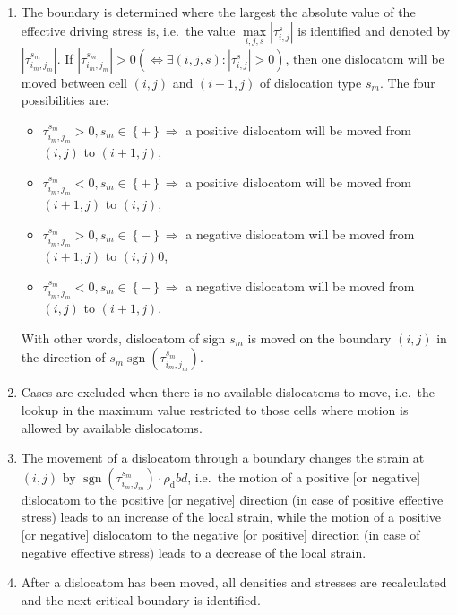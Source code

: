 \begin{enumerate}
\item The boundary is determined where the largest the absolute value of the effective driving stress is, i.e.\ the value $\mathop {\max }\limits_{i,j,s} \left| {\tau _{i,j}^s} \right|$ is identified and denoted by $\left| {\tau _{{i_m},{j_m}}^{{s_m}}} \right|$. If $\left| {\tau _{{i_m},{j_m}}^{{s_m}}} \right| > 0\left( { \Leftrightarrow \exists \left( {i,j,s} \right):\left| {\tau _{i,j}^s} \right| > 0} \right)$, then one dislocatom will be moved between cell $\left( {i,j} \right)$ and $\left( {i+1,j} \right)$ of dislocation type $s_m$. The four possibilities are:
\begin{itemize}
\item $\tau _{{i_m},{j_m}}^{{s_m}} > 0,{s_m} \in \left\{  +  \right\} \Rightarrow $ a positive dislocatom will be moved from $\left( {i,j} \right)$ to $\left( {i+1,j} \right)$,
\item $\tau _{{i_m},{j_m}}^{{s_m}} < 0,{s_m} \in \left\{  +  \right\} \Rightarrow $ a positive dislocatom will be moved from $\left( {i+1,j} \right)$ to $\left( {i,j} \right)$,
\item $\tau _{{i_m},{j_m}}^{{s_m}} > 0,{s_m} \in \left\{  -  \right\} \Rightarrow $ a negative dislocatom will be moved from $\left( {i+1,j} \right)$ to $\left( {i,j} \right)$0,
\item $\tau _{{i_m},{j_m}}^{{s_m}} < 0,{s_m} \in \left\{  -  \right\} \Rightarrow $ a negative dislocatom will be moved from $\left( {i,j} \right)$ to $\left( {i+1,j} \right)$.
\end{itemize}
With other words, dislocatom of sign $s_m$ is moved on the boundary $\left( {i,j} \right)$ in the direction of ${s_m}\operatorname{sgn} \left( {\tau _{{i_m},{j_m}}^{{s_m}}} \right)$.
\item Cases are excluded when there is no available dislocatoms to move, i.e.\ the lookup in the maximum value restricted to those cells where motion is allowed by available dislocatoms.
\item The movement of a dislocatom through a boundary changes the strain at $\left( {i,j} \right)$ by $\operatorname{sgn} \left( {\tau _{{i_m},{j_m}}^{{s_m}}} \right) \cdot {\rho _{\text{d}}}bd$, i.e.\ the motion of a positive [or negative] dislocatom to the positive [or negative] direction (in case of positive effective stress) leads to an increase of the local strain, while the motion of a positive [or negative] dislocatom to the negative [or positive] direction (in case of negative effective stress) leads to a decrease of the local strain.
\item After a dislocatom has been moved, all densities and stresses are recalculated and the next critical boundary is identified.
\end{enumerate}

